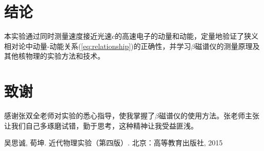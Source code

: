 \documentclass[aps,pre,12pt,preprint,onecolumn,showpacs,showkeys]{revtex4-1}
\begin{document}
\section{结论}
本实验通过同时测量速度接近光速$c$的高速电子的动量和动能，定量地验证了狭义相对论中动量-动能关系(\ref{eq:relationship})的正确性，并学习$\beta$磁谱仪的测量原理及其他核物理的实验方法和技术。

\section{致谢}
感谢张双全老师对实验的悉心指导，使我掌握了$\beta$磁谱仪的使用方法。张老师主张让我们自己多琢磨试错，勤于思考，这种精神让我受益匪浅。
    
\begin{thebibliography}{}
 吴思诚, 荀坤. 近代物理实验（第四版）. 北京：高等教育出版社, 2015
\end{thebibliography}
\end{document}
